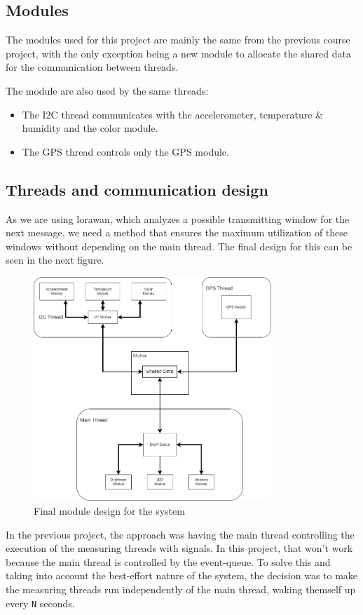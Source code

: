 \subsection{Modules}
The modules used for this project are mainly the same from the previous course project, with the only exception being a new module to allocate the shared data for the communication between threads.

The module are also used by the same threads:
\begin{itemize}
    \item The I2C thread communicates with the accelerometer, temperature \& humidity and the color module.
    \item The GPS thread controls only the GPS module.
\end{itemize}

\clearpage
\subsection{Threads and communication design} %

As we are using \acrshort{lorawan}, which analyzes a possible transmitting window for the next message, we need a method that ensures the maximum utilization of these windows without depending on the main thread. The final design for this can be seen in the next figure.

\begin{figure}[H]
    \centering
    \includegraphics[width=0.8\textwidth]{images/4/Modules.png}
    \caption{Final module design for the system}
    \label{fig:modules}
\end{figure}
In the previous project, the approach was having the main thread controlling the execution of the measuring threads with signals. In this project, that won't work because the main thread is controlled by the event-queue. 
To solve this and taking into account the best-effort nature of the system, the decision was to make the measuring threads run independently of the main thread, waking themself up every \texttt{N} seconds. 

